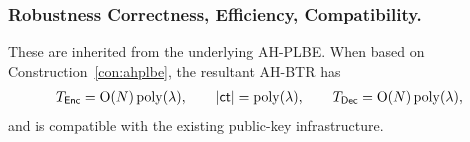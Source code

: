 \subsubsection{Robustness Correctness, Efficiency, Compatibility.}
These are inherited from the underlying AH-PLBE.
When based on Construction~\ref{con:ahplbe},
the resultant AH-BTR has
\begin{align*}
T_\Enc=\bigO(N)\poly(\lambda),\qquad
|\ct|=\poly(\lambda),\qquad
T_\Dec=\bigO(N)\poly(\lambda),
\end{align*}
and is compatible with the existing public-key infrastructure.

